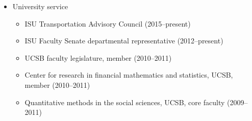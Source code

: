 \documentclass[overlapped,line]{res}
\begin{document}
\begin{resume}
\begin{itemize}
\item University service
\begin{itemize}
\item ISU Transportation Advisory Council (2015--present)
\item ISU Faculty Senate departmental representative (2012--present)
\item UCSB faculty legislature, member (2010--2011)
\item Center for research in financial mathematics and statistics, UCSB, member (2010--2011)
\item Quantitative methods in the social sciences, UCSB, core faculty (2009--2011)
 \end{itemize}



\end{itemize}
\end{resume}
\end{document}
